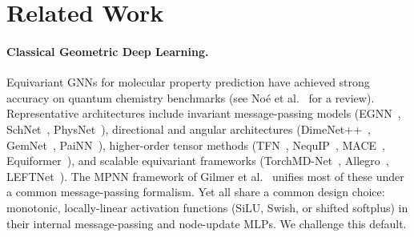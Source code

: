 \documentclass[10pt,twocolumn,letterpaper]{article}
\begin{document}
\section{Related Work}
\label{sec:related}

\paragraph{Classical Geometric Deep Learning.}
Equivariant GNNs for molecular property prediction have achieved strong accuracy on quantum chemistry benchmarks (see No{\'e} et al.~\cite{Noe:2019yup} for a review). Representative architectures include invariant message-passing models (EGNN~\cite{satorras2022enequivariantgraphneural}, SchNet~\cite{schütt2017schnetcontinuousfilterconvolutionalneural}, PhysNet~\cite{unkePhysNetNeuralNetwork2019}), directional and angular architectures (DimeNet++~\cite{klicperaFastUncertaintyAwareDirectional2020}, GemNet~\cite{klicperaGemNetUniversalDirectional2021}, PaiNN~\cite{schuttEquivariantMessagePassing2021}), higher-order tensor methods (TFN~\cite{thomasTensorFieldNetworks2018}, NequIP~\cite{batznerE3equivariantGraphNeural2021}, MACE~\cite{batatiaMACEHigherOrder2022}, Equiformer~\cite{liao2023equiformer}), and scalable equivariant frameworks (TorchMD-Net~\cite{tholke2022torchmdnet}, Allegro~\cite{musaelianLearningLocalEquivariant2022}, LEFTNet~\cite{duNewPerspectiveBuilding2023}). The MPNN framework of Gilmer et al.~\cite{gilmer2017neural} unifies most of these under a common message-passing formalism. Yet all share a common design choice: monotonic, locally-linear activation functions (SiLU, Swish, or shifted softplus) in their internal message-passing and node-update MLPs. We challenge this default.
\end{document}
